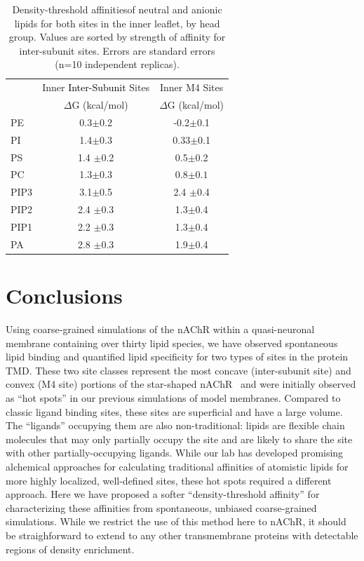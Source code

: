 \documentclass[%
 aip,
 amsmath,amssymb,
 preprint,%
]{revtex4-1}\usepackage{setspace}
\newcommand{\newaffinity}{density-threshold affinity}
\newcommand{\Newaffinities}{Density-threshold affinities}
\newcommand{\liam}[1]{\textcolor{black}{#1}}
\newcommand{\nachr}{nAChR}
\begin{document}
\begin{table}
	\caption{\Newaffinities of neutral and anionic lipids for both sites in the inner leaflet, by head group. Values are sorted by strength of affinity for inter-subunit sites. Errors are standard errors (n=10 independent replicas). }
    \centering
    \begin{tabular}{|l||c|c|}
    \hline
	{} &  Inner \liam{Inter-Subunit} Sites&  Inner M4 Sites\\
	{} & $\Delta$G (kcal/mol) & $\Delta$G (kcal/mol) \\
	\hline
	PE& 0.3$\pm$0.2& -0.2$\pm$0.1\\
	PI&1.4$\pm$0.3 &  0.33$\pm$0.1\\
	PS&1.4 $\pm$0.2	&  0.5$\pm$0.2\\
	PC &1.3$\pm$0.3 &	0.8$\pm0.1$ \\
	PIP3	&3.1$\pm$0.5	 &  2.4 $\pm$0.4\\
	PIP2	&2.4 $\pm$0.3	&  1.3$\pm$0.4\\
	PIP1	&2.2 $\pm$0.3	&  1.3$\pm$0.4\\
	PA	&2.8 $\pm$0.3	&  1.9$\pm$0.4\\
	\hline
    \end{tabular}
    \label{tab:dGInnerHG}
\end{table}

\section{Conclusions}

\label{con}

Using coarse-grained simulations of the \nachr{} within a quasi-neuronal membrane containing over thirty lipid species, we have observed spontaneous lipid binding and quantified lipid specificity for two types of sites in the protein TMD.  These two site classes represent the most concave (inter-subunit site) and convex (M4 site) portions of the star-shaped \nachr~ and were initially observed as ``hot spots'' in our previous simulations\cite{Woods2019,Tong2019} of model membranes. Compared to classic ligand binding sites, these sites are superficial and have a large volume. The ``ligands'' occupying them are also non-traditional: lipids are flexible chain molecules that may only partially occupy the site and are likely to share the site with other partially-occupying ligands.  While our lab has developed promising alchemical approaches\cite{Salari2019} for calculating traditional affinities of atomistic lipids for more highly localized, well-defined sites, these hot spots required a different approach. Here we have proposed a softer ``\newaffinity'' for characterizing these affinities from spontaneous, unbiased coarse-grained simulations. While we restrict the use of this method here to \nachr, it should be straighforward to extend to any other transmembrane proteins with detectable regions of density enrichment. 
\end{document}
